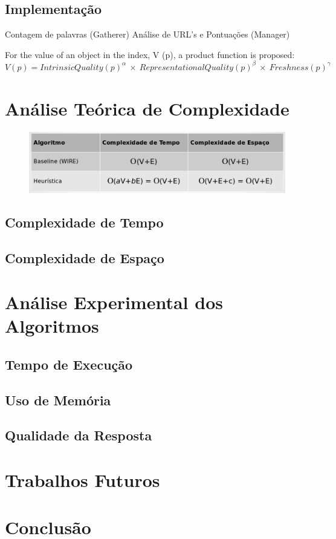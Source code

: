 \documentclass[a4paper,12pt,titlepage]{article}
\begin{document}
\subsection{Implementação}

Contagem de palavras (Gatherer)
Análise de URL's e Pontuações (Manager)


For the value of an object in the index, V (p), a product function is proposed: \\

$V(p) = IntrinsicQuality(p)^\alpha \ \times \ RepresentationalQuality(p)^\beta \ \times \ Freshness(p)^\gamma$



\section{Análise Teórica de Complexidade}

\begin{figure}[H]
     \centering
     \includegraphics[scale=0.4]{figures/complexity.png}
     \caption{}
     \label{bsp}
\end{figure}

\subsection{Complexidade de Tempo}
\subsection{Complexidade de Espaço}

\section{Análise Experimental dos Algoritmos}
\subsection{Tempo de Execução}
\subsection{Uso de Memória}
\subsection{Qualidade da Resposta}

\section{Trabalhos Futuros}
\section{Conclusão}


\newpage
\end{document}
